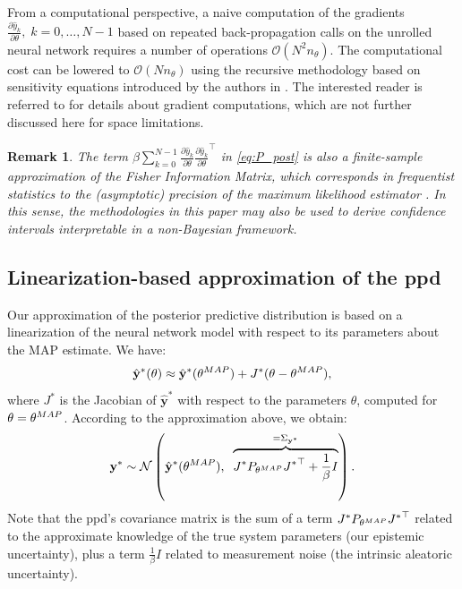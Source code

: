 \documentclass{ifacconf}
\newcommand{\nsamp}{N}
\newcommand{\npar}{{n_\theta}}
\newcommand{\N}{\mathcal{N}} %
\newcommand{\MAP}{{\rm MAP}}
\newcommand{\tvec}[1]{{\mathbf{#1}}}
\newcommand{\mean}[1]{\hat{#1}}
\newtheorem{remark}{Remark}%
\begin{document}
From a computational perspective, a naive computation of the gradients $\frac{\partial \mean{y}_k}{\partial \theta},\; k\!=\!0,\dots,\nsamp\!-\!1$ based on
repeated back-propagation calls on the unrolled neural network requires a number of operations $\mathcal{O}(N^2 \npar)$. 
The computational cost can be lowered to $\mathcal{O}(N \npar)$ using the recursive methodology based on sensitivity equations introduced by the authors in \cite{forgione2022adaptation}. The interested reader is referred to \cite{forgione2022adaptation} for details about gradient computations, which are 
not further discussed here for space limitations.


\begin{remark}
The term $\beta \!\sum_{k=0}^{\nsamp-1} \frac{\partial \mean{y}_k}{\partial \theta} {\frac{\partial \mean{y}_k}{\partial \theta}}^\top$ in \eqref{eq:P_post} is also a finite-sample approximation of the \emph{Fisher Information Matrix}, which corresponds in frequentist statistics to the (asymptotic) precision of the maximum likelihood estimator \cite{van2007parameter}. In this sense, the methodologies in this paper may also be used to derive confidence intervals interpretable in a non-Bayesian framework.
\end{remark}


\subsection{Linearization-based approximation of the ppd}
Our approximation of the posterior predictive distribution is based on a linearization of the neural network model with respect to its parameters about the MAP estimate.
We have:
\begin{equation}
 \mean{\tvec{y}}^*(\theta) \approx \mean{\tvec{y}}^*(\theta^{\MAP}) + J^*(\theta - \theta^{\MAP}),%
\end{equation}
where $J^{*}$ is the Jacobian of $\mean{\tvec{y}}^*$ with respect to the parameters $\theta$, computed for $\theta=\theta^{\rm MAP}$.
According to the approximation above, we obtain:
\begin{equation}
\label{eq:ppd_approx}
 \tvec{y}^* \sim \N \left(\mean{\tvec{y}}^*(\theta^{\MAP}),\;\; \overbrace{J^* P_{\theta^{\MAP}} {J^*}^\top  + \frac{1}{\beta} I}^{=\Sigma_{\tvec{y}^*}} \right).
\end{equation}
Note that the ppd's covariance matrix is the sum of a term $J^* P_{\theta^{\MAP}} {J^*}^\top$ related to the approximate knowledge of the true system parameters (our epistemic uncertainty), plus a term $\frac{1}{\beta} I$ related to measurement noise (the intrinsic aleatoric uncertainty). 
\end{document}
